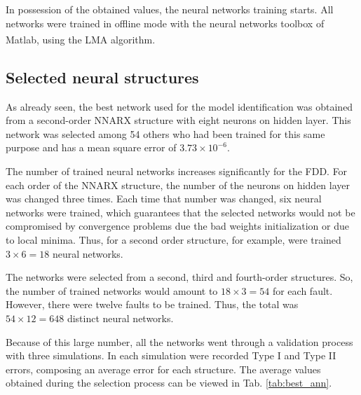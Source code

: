 \documentclass[10pt,fleqn,a4paper]{article}
\newcommand{\reg}{\textsuperscript{\textregistered}}
\begin{document}
In possession of the obtained values, the neural networks training starts. All
networks were trained in offline mode with the neural networks toolbox of
Matlab\reg, using the LMA algorithm.

\subsection{Selected neural structures}
As already seen, the best network used for the model identification was obtained
from a second-order NNARX structure with eight neurons on hidden layer. This
network was selected among 54 others who had been trained for this same purpose
and has a mean square error of $3.73 \times 10^{-6}$.

The number of trained neural networks increases significantly for the FDD. For
each order of the NNARX structure, the number of the neurons on hidden layer was
changed three times. Each time that number was changed, six neural networks were
trained, which guarantees that the selected networks would not be compromised by
convergence problems due the bad weights initialization or due to local minima.
Thus, for a second order structure, for example, were trained $3 \times 6 = 18$
neural networks.

The networks were selected from a second, third and fourth-order structures. So,
the number of trained networks would amount to $18 \times 3 = 54$ for each
fault. However, there were twelve faults to be trained. Thus, the total was $54
\times 12 = 648$ distinct neural networks.

Because of this large number, all the networks went through a validation process
with three simulations. In each simulation were recorded Type I and Type II
errors, composing an average error for each structure. The average values
obtained during the selection process can be viewed in Tab. \ref{tab:best_ann}.
\end{document}

